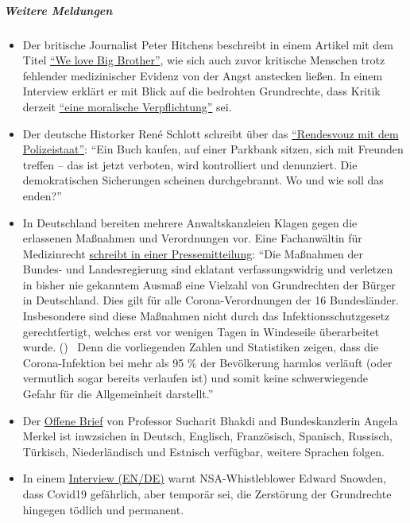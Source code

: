 \hypertarget{weitere-meldungen-2}{%
\subparagraph{\texorpdfstring{\textbf{Weitere
Meldungen}}{Weitere Meldungen}}\label{weitere-meldungen-2}}

\begin{itemize}
\tightlist
\item
  Der britische Journalist Peter Hitchens beschreibt in einem Artikel
  mit dem Titel
  \href{https://www.firstthings.com/web-exclusives/2020/04/we-love-big-brother}{``We
  love Big Brother''}, wie sich auch zuvor kritische Menschen trotz
  fehlender medizinischer Evidenz von der Angst anstecken ließen. In
  einem Interview erklärt er mit Blick auf die bedrohten Grundrechte,
  dass Kritik derzeit
  \href{https://www.spiked-online.com/podcast-episode/in-this-lockdown-dissent-is-a-moral-duty/}{``eine
  moralische Verpflichtung''} sei.
\item
  Der deutsche Historker René Schlott schreibt über das
  \href{https://www.spiegel.de/politik/deutschland/corona-krise-und-buergerrechte-rendezvous-mit-dem-polizeistaat-a-68611322-f4d4-453f-aba5-5ec5a49ae329}{``Rendesvouz
  mit dem Polizeistaat''}: ``Ein Buch kaufen, auf einer Parkbank sitzen,
  sich mit Freunden treffen -- das ist jetzt verboten, wird kontrolliert
  und denunziert. Die demokratischen Sicherungen scheinen durchgebrannt.
  Wo und wie soll das enden?''
\item
  In Deutschland bereiten mehrere Anwaltskanzleien Klagen gegen die
  erlassenen Maßnahmen und Verordnungen vor. Eine Fachanwältin für
  Medizinrecht
  \href{http://beatebahner.de/lib.medien/aktualisierte\%20Pressemitteilung.pdf}{schreibt
  in einer Pressemitteilung}: ``Die Maßnahmen der Bundes- und
  Landesregierung sind eklatant verfassungswidrig und verletzen in
  bisher nie gekanntem Ausmaß eine Vielzahl von Grundrechten der Bürger
  in Deutschland. Dies gilt für alle Corona-Verordnungen der 16
  Bundesländer. Insbesondere sind diese Maßnahmen nicht durch das
  Infektionsschutzgesetz gerechtfertigt, welches erst vor wenigen Tagen
  in Windeseile überarbeitet wurde. ()~ Denn die vorliegenden Zahlen und
  Statistiken zeigen, dass die Corona-Infektion bei mehr als 95 \% der
  Bevölkerung harmlos verläuft (oder vermutlich sogar bereits verlaufen
  ist) und somit keine schwerwiegende Gefahr für die Allgemeinheit
  darstellt.''
\item
  Der
  \href{https://swprs.org/offener-brief-von-professor-sucharit-bhakdi-an-bundeskanzlerin-dr-angela-merkel/}{Offene
  Brief} von Professor Sucharit Bhakdi and Bundeskanzlerin Angela Merkel
  ist inwzsichen in Deutsch, Englisch, Französisch, Spanisch, Russisch,
  Türkisch, Niederländisch und Estnisch verfügbar, weitere Sprachen
  folgen.
\item
  In einem \href{https://www.youtube.com/watch?v=-pcQFTzck_c}{Interview
  (EN/DE)} warnt NSA-Whistleblower Edward Snowden, dass Covid19
  gefährlich, aber temporär sei, die Zerstörung der Grundrechte hingegen
  tödlich und permanent.
\end{itemize}

